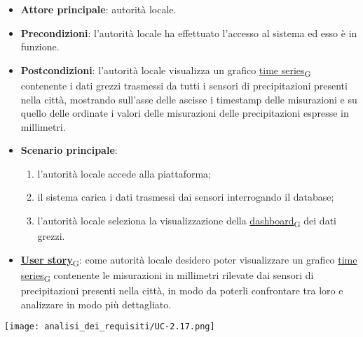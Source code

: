 \newpage
{}
\begin{itemize}
	\item \textbf{Attore principale}: autorità locale.
	\item \textbf{Precondizioni}: l'autorità locale ha effettuato l'accesso al sistema ed esso è in funzione.
	\item \textbf{Postcondizioni}: l'autorità locale visualizza un grafico \href{https://7last.github.io/docs/pb/documentazione-interna/glossario\#time-series}{time series\textsubscript{G}} contenente i dati grezzi trasmessi da tutti i sensori di precipitazioni presenti nella città, mostrando sull'asse delle ascisse i timestamp delle misurazioni e su quello delle ordinate i valori delle misurazioni delle precipitazioni espresse in millimetri.
	\item \textbf{Scenario principale}:
	      \begin{enumerate}
		      \item l'autorità locale accede alla piattaforma;
		      \item il sistema carica i dati trasmessi dai sensori interrogando il database;
		      \item l'autorità locale seleziona la visualizzazione della \href{https://7last.github.io/docs/pb/documentazione-interna/glossario\#dashboard}{dashboard\textsubscript{G}} dei dati grezzi.
	      \end{enumerate}
	\item \href{https://7last.github.io/docs/pb/documentazione-interna/glossario\#user-story}{\textbf{User story}\textsubscript{G}}:
	      come autorità locale desidero poter visualizzare un grafico \href{https://7last.github.io/docs/pb/documentazione-interna/glossario\#time-series}{time series\textsubscript{G}} contenente le misurazioni in millimetri rilevate dai sensori
	      di precipitazioni presenti nella città, in modo da poterli confrontare tra loro e analizzare in modo più dettagliato.
\end{itemize}
\begin{center}
	\texttt{[image: analisi\_dei\_requisiti/UC-2.17.png]}
\end{center}

